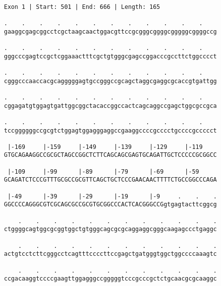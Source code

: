 \documentclass{article}
\begin{document}
 \begin{Verbatim}
 
Exon 1 | Start: 501 | End: 666 | Length: 165
 
.    .    .    .    .    .    .    .    .    .    .    .    
gaaggcgagcggcctcgctaagcaactggacgttccgcgggcggggcgggggcggggccg
                                                            
.    .    .    .    .    .    .    .    .    .    .    .    
gggcccgagtccgctcggaaactttcgctgtgggcgagccggacccgccttctggcccct
                                                            
.    .    .    .    .    .    .    .    .    .    .    .    
cgggcccaaccacgcagggggagtgccgggccgcagctaggcgaggcgcaccgtgattgg
                                                            
.    .    .    .    .    .    .    .    .    .    .    .    
cggagatgtggagtgattggcggctacaccggccactcagcaggccgagctggcgccgca
                                                            
.    .    .    .    .    .    .    .    .    .    .    .    
tccggggggccgcgtctggagtggagggaggccgaaggccccgcccctgccccgccccct
                                                            
 |-169     |-159     |-149     |-139     |-129     |-119    
GTGCAGAAGGCCGCGCTAGCCGGCTCTTCAGCAGCGAGTGCAGATTGCTCCCCCGCGGCC
                                                            
 |-109     |-99      |-89      |-79      |-69      |-59     
GCAGATCTCCCGTTTGCGCCGCGTTCAGCTGCTCCCGAACAACTTTTCTGCCGGCCCAGA
                                                            
 |-49      |-39      |-29      |-19      |-9     .    .    .
GGCCCCAGGGCGTCGCAGCGCCGCGTGCGGCCCACTCACGGGCCGgtgagtacttcggcg
                                                            
    .    .    .    .    .    .    .    .    .    .    .    .
ctggggcagtggcgcggtggctgtgggcagcgcgcaggaggcgggcaagagccctgaggc
                                                            
    .    .    .    .    .    .    .    .    .    .    .    .
actgtcctcttcgggcctcagtttccccttccgagctgatgggtggctggccccaaagtc
                                                            
    .    .    .    .    .    .    .    .    .    .    .    .
ccgacaaggtccccgaagttggagggccgggggtcccgcccgctctgcaacgcgcaaggc
                                                            

\end{Verbatim}
\end{document}
